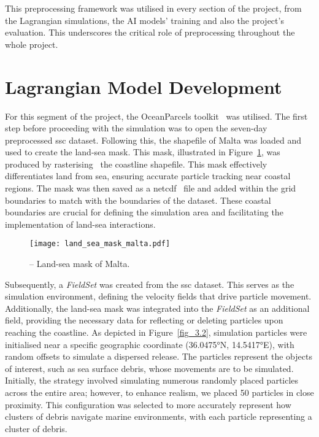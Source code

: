 This preprocessing framework was utilised in every section of the project, from the Lagrangian simulations, the AI models’ training and also the project’s evaluation. This underscores the critical role of preprocessing throughout the whole project. 

\section{Lagrangian Model Development}
\label{sec:3.2}

For this segment of the project, the OceanParcels toolkit~\cite{20} was utilised. The first step before proceeding with the simulation was to open the seven-day preprocessed \acrshort{ssc} dataset. Following this, the shapefile of Malta was loaded and used to create the land-sea mask. This mask, illustrated in Figure~\ref{fig_3.1}, was produced by rasterising~\cite{47} the coastline shapefile. This mask effectively differentiates land from sea, ensuring accurate particle tracking near coastal regions. The mask was then saved as a \acrshort{netcdf}~\cite{13} file and added within the grid boundaries to match with the boundaries of the dataset. These coastal boundaries are crucial for defining the simulation area and facilitating the implementation of land-sea interactions.

\begin{figure}[htbp]
    \centering
    \texttt{[image: land\_sea\_mask\_malta.pdf]}
    \caption[Land-sea mask of Malta.]{-- Land-sea mask of Malta.\label{fig_3.1}}
\end{figure}

Subsequently, a \textit{FieldSet} was created from the \acrshort{ssc} dataset. This serves as the simulation environment, defining the velocity fields that drive particle movement. Additionally, the land-sea mask was integrated into the \textit{FieldSet} as an additional field, providing the necessary data for reflecting or deleting particles upon reaching the coastline. As depicted in Figure~\ref{fig_3.2}, simulation particles were initialised near a specific geographic coordinate (36.0475°N, 14.5417°E), with random offsets to simulate a dispersed release. The particles represent the objects of interest, such as sea surface debris, whose movements are to be simulated. Initially, the strategy involved simulating numerous randomly placed particles across the entire area; however, to enhance realism, we placed 50 particles in close proximity. This configuration was selected to more accurately represent how clusters of debris navigate marine environments, with each particle representing a cluster of debris.

